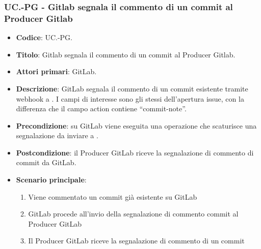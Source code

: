 \subsubsection{UC\theuccount.\thesubuccount-PG - Gitlab segnala il commento di un commit al Producer Gitlab}
\begin{itemize}
    \item \textbf{Codice}: UC\theuccount.\thesubuccount-PG.
    \item \textbf{Titolo}: Gitlab segnala il commento di un commit al Producer Gitlab.
    \item \textbf{Attori primari}: GitLab.
    \item \textbf{Descrizione}: GitLab segnala il commento di un commit esistente tramite webhook a \progetto.
    I campi di interesse sono gli stessi dell'apertura issue, con la differenza che il campo action contiene ``commit-note''.
    \item \textbf{Precondizione}: su GitLab viene eseguita una operazione che scaturisce una
    segnalazione da inviare a \progetto.
    \item \textbf{Postcondizione}: il Producer GitLab riceve la segnalazione di commento di commit da GitLab.
    \item \textbf{Scenario principale}:
    \begin{enumerate}
        \item Viene commentato un commit già esistente su GitLab
        \item GitLab procede all'invio della segnalazione di commento commit al Producer GitLab
        \item Il Producer GitLab riceve la segnalazione di commento di un commit
    \end{enumerate}

\end{itemize}
